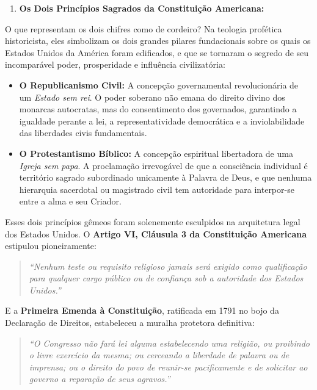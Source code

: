 \begin{enumerate}
  \item \textbf{Os Dois Princípios Sagrados da Constituição Americana:}
\end{enumerate}

O que representam os dois chifres como de cordeiro? Na teologia profética historicista, eles simbolizam os dois grandes pilares fundacionais sobre os quais os Estados Unidos da América foram edificados, e que se tornaram o segredo de seu incomparável poder, prosperidade e influência civilizatória:
\begin{itemize}
  \item \textbf{O Republicanismo Civil:} A concepção governamental revolucionária de um \textit{Estado sem rei}. O poder soberano não emana do direito divino dos monarcas autocratas, mas do consentimento dos governados, garantindo a igualdade perante a lei, a representatividade democrática e a inviolabilidade das liberdades civis fundamentais.
  \item \textbf{O Protestantismo Bíblico:} A concepção espiritual libertadora de uma \textit{Igreja sem papa}. A proclamação irrevogável de que a consciência individual é território sagrado subordinado unicamente à Palavra de Deus, e que nenhuma hierarquia sacerdotal ou magistrado civil tem autoridade para interpor-se entre a alma e seu Criador.
\end{itemize}


Esses dois princípios gêmeos foram solenemente esculpidos na arquitetura legal dos Estados Unidos. O \textbf{Artigo VI, Cláusula 3 da Constituição Americana} estipulou pioneiramente:


\begin{quote}
\itshape \textit{``Nenhum teste ou requisito religioso jamais será exigido como qualificação para qualquer cargo público ou de confiança sob a autoridade dos Estados Unidos.''}
\end{quote}


E a \textbf{Primeira Emenda à Constituição}, ratificada em 1791 no bojo da Declaração de Direitos, estabeleceu a muralha protetora definitiva:


\begin{quote}
\itshape \textit{``O Congresso não fará lei alguma estabelecendo uma religião, ou proibindo o livre exercício da mesma; ou cerceando a liberdade de palavra ou de imprensa; ou o direito do povo de reunir-se pacificamente e de solicitar ao governo a reparação de seus agravos.''}
\end{quote}


